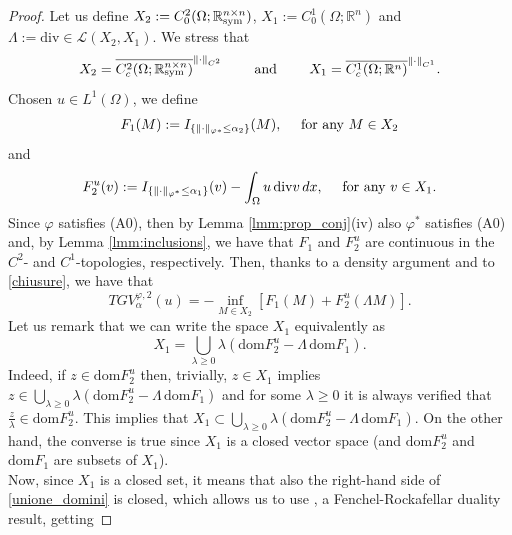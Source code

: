 \documentclass[a4paper,11pt,oneside,notitlepage]{article}
\numberwithin{equation}{section}
\def\R{\mathbb{R}}
\def\sym{{\rm sym}}
\renewcommand{\div}{\mathrm{div}}
\newcommand{\dom}{\mathrm{dom}}
\newcommand{\vphi}{\varphi}
\begin{document}
\begin{proof}
    Let us define $X_2 := C^2_0(\Omega; \R^{n \times n}_\sym)$, $X_1 := C^1_0(\Omega; \R^n)$ and $\Lambda := \div \in \mathcal{L}(X_2,X_1)$. We stress that
    \begin{equation}
    \label{chiusure}
        X_2 = \overline{C^2_c(\Omega;\R^{n \times n}_\sym)}^{\|\cdot\|_{C^2}}
        \qquad \textnormal{ and } \qquad
        X_1 = \overline{C^1_c(\Omega;\R^n) }^{\|\cdot\|_{C^1}}.
    \end{equation}
    Chosen $u \in L^1(\Omega)$, we define
    \begin{equation*}
        F_1(M) := I_{\{ \|\cdot\|_{\vphi*} \le \alpha_2\}}(M), \quad \textnormal{ for any } M \in X_2
    \end{equation*}
    and
    \begin{equation*}
        F_2^u(v) := I_{\{\| \cdot\|_{\vphi^*} \le \alpha_1\}}(v) - \int_\Omega u\,\div v \, dx, \quad \textnormal{ for any } v \in X_1.
    \end{equation*}
    Since $\vphi$ satisfies (A0), then by Lemma \ref{lmm:prop_conj}(iv) also $\vphi^*$ satisfies (A0) and, by Lemma \ref{lmm:inclusions}, we have that $F_1$ and $F^u_2$ are continuous in the $C^2$- and $C^1$-topologies, respectively. Then, thanks to a density argument and to \eqref{chiusure}, we have that
    \begin{equation*}
        TGV^{\vphi, 2}_\alpha(u) = -\inf_{M \in X_2} \left[ F_1(M) + F_2^u(\Lambda M) \right].
    \end{equation*}
    Let us remark that we can write the space $X_1$ equivalently as
    \begin{equation}
    \label{unione_domini}
        X_1 = \bigcup_{\lambda \ge 0} \lambda \left(\dom F_2^u - \Lambda \, \dom F_1\right).
    \end{equation}
    Indeed, if $z \in \dom F_2^u$ then, trivially, $z \in X_1$ implies $z \in \bigcup_{\lambda \ge 0}\lambda\left(\dom F_2^u - \Lambda \, \dom F_1\right)$ and for some $\lambda \ge 0$ it is always verified that $\tfrac{z}{\lambda} \in \dom F^u_2$. This implies that $X_1 \subset \bigcup_{\lambda \ge 0}\lambda\left(\dom F_2^u - \Lambda \, \dom F_1\right)$. On the other hand, the converse is true since $X_1$ is a closed vector space (and $\dom F^u_2$ and $\dom F_1$ are subsets of $X_1$).
    \\
    Now, since $X_1$ is a closed set, it means that also the right-hand side of \eqref{unione_domini} is closed, which allows us to use \cite[Corollary 2.3]{AtBr86}, a Fenchel-Rockafellar duality result, getting

\end{proof}
\end{document}
